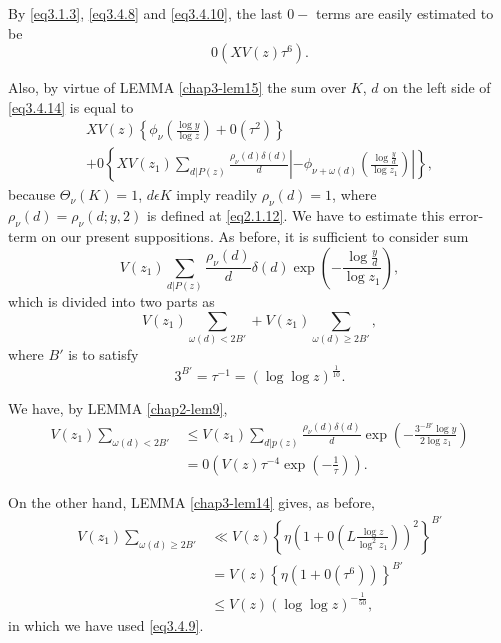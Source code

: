 By \eqref{eq3.1.3}, \eqref{eq3.4.8} and \eqref{eq3.4.10}, the last
$0-$ terms are easily estimated to be 
\begin{equation*}
  0 (XV(z) \tau^6 ). \tag{3.4.15}\label{eq3.4.15}
\end{equation*}

Also, by virtue of LEMMA \ref{chap3-lem15} the sum over $K$, $d$ on
the left side of \eqref{eq3.4.14} is equal to 
\begin{gather*}
  XV(z) \left\{ \phi_\nu \left(\frac{\log y}{\log z}\right) + 0
  (\tau^2) \right\} \\ 
  + 0 \left\{XV(z_1) \sum_{d|P(z)} \frac{\rho_\nu (d) \delta
    (d)}{d}|-\phi_{\nu + \omega (d)} \left(\frac{\log \frac{y}{d}}{\log
    z_1}\right)| \right\},  \tag{3.4.16} \label{eq3.4.16}
\end{gather*}
because $\Theta_\nu (K) = 1$, $d\epsilon  K$ imply readily $\rho_\nu
(d) =1$, where $\rho_\nu (d) = \rho_\nu (d; y, 2)$ is defined at
\eqref{eq2.1.12}. We have to estimate this error-term on our present
suppositions. As before, it is sufficient to consider sum 
$$
V(z_1) \sum_{d| P (z)} \frac{\rho_\nu (d)}{d} \delta (d) \exp \left(-
\frac{\log \frac{y}{d}}{\log z_1}\right), 
$$
which is divided into two parts as
\begin{equation*}
  V(z_1) \sum_{\omega (d) < 2B'} + V(z_1) \sum_{\omega (d) \geq 2B'},
  \tag{3.4.17}\label{eq3.4.17} 
\end{equation*}
where $B'$ is to satisfy
$$
3^{B'} = \tau^{-1} = (\log \log z)^{\frac{1}{10}}.
$$\pageoriginale

We have, by LEMMA \ref{chap2-lem9},
\begin{align*}
  V(z_1) \sum_{\omega (d) < 2B'} &\leq V(z_1) \sum_{d|p (z)}
  \frac{\rho_\nu (d) \delta (d)}{d} \exp \left(-\frac{3^{-B'} \log y}{2 \log
    z_1}\right) \\ 
 &= 0 \left(V(z) \tau^{-4}
  \exp\left(-\frac{1}{\tau}\right)\right). \tag{3.4.18}\label{eq3.4.18}
\end{align*}

On the other hand, LEMMA \ref{chap3-lem14} gives, as before,
\begin{align*}
  V(z_1) \sum_{\omega (d) \ge 2B'} & \ll V(z) \left\{ \eta \left(1 + 0\left(L
  \frac{\log z}{\log^2z_1}\right)\right)^2\right\}^{B'} \\ 
  & = V(z) \left\{ \eta (1 + 0 (\tau^6))\right\}^{B'} \\
  & \le V(z) (\log \log z)^{- \frac{1}{50}},\tag{3.4.19}\label{eq3.4.19}
\end{align*}
in which we have used \eqref{eq3.4.9}.

